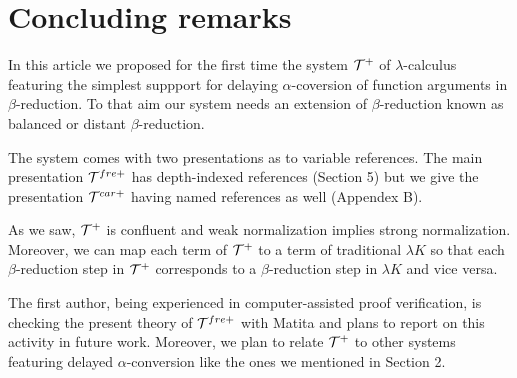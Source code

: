 \section{Concluding remarks}
\label{sec:conclusion}

In this article we proposed for the first time the system $\cal{T}^{+}$ of
$\lambda$-calculus featuring the simplest suppport for delaying
$\alpha$-coversion of function arguments in $\beta$-reduction.
To that aim our system needs an extension of $\beta$-reduction known
as balanced or distant $\beta$-reduction.

The system comes with two presentations as to variable references.
The main presentation $\mathcal{T}^{fre+}$ has depth-indexed references (Section 5)
but we give the presentation $\mathcal{T}^{car+}$ having named references as well (Appendex B).

As we saw, $\cal{T}^{+}$ is confluent
and weak normalization implies strong normalization.
Moreover, we can map each term of $\cal{T}^{+}$ to a term of
traditional $\lambda K$ so that each $\beta$-reduction step in $\cal{T}^{+}$
corresponds to a $\beta$-reduction step in $\lambda K$ and vice versa.

The first author, being experienced in computer-assisted proof verification,
is checking the present theory of $\mathcal{T}^{fre+}$ with Matita \cite{ARST11}
and plans to report on this activity in future work.
Moreover, we plan to relate $\cal{T}^{+}$ to
other systems featuring delayed $\alpha$-conversion
like the ones we mentioned in Section 2.
